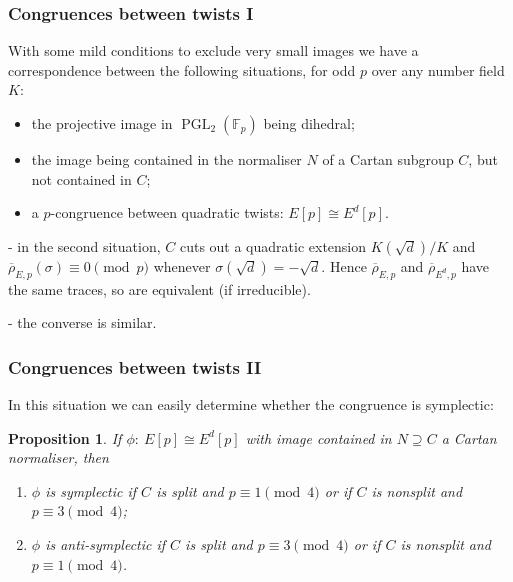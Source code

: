 \documentclass[handout]{beamer}
\newtheorem{prop}{Proposition}
\newcommand{\rhobar}{\overline{\rho}}
\newcommand{\F}{\mathbb F}
\newcommand{\PGL}{\operatorname{PGL}}
\begin{document}
\begin{frame}\frametitle{Congruences between twists I}
With some mild conditions to exclude very small images we have a
correspondence between the following situations, for odd $p$ over any
number field $K$:
\begin{itemize}
\item the projective image in $\PGL_2(\F_p)$ being dihedral;
\item the image being contained in the normaliser $N$ of a Cartan
  subgroup $C$, but not contained in $C$;
  \item a $p$-congruence between quadratic twists: $E[p]\cong E^d[p]$.
\end{itemize}
\pause\medskip

- in the second situation, $C$ cuts out a quadratic extension
$K(\sqrt{d})/K$ and $\rhobar_{E,p}(\sigma)\equiv0\pmod{p}$ whenever
$\sigma(\sqrt{d})=-\sqrt{d}$.  Hence $\rhobar_{E,p}$ and
$\rhobar_{E^d,p}$ have the same traces, so are equivalent (if
irreducible).
\pause\medskip

- the converse is similar.
\end{frame}

\begin{frame}\frametitle{Congruences between twists II}
  In this situation we can easily determine whether the congruence is
  symplectic:
  \pause  \medskip

  \begin{prop}
  If $\phi:\ E[p]\cong E^d[p]$ with image contained in $N\supseteq C$ a
  Cartan normaliser, then%
  \begin{enumerate}
    \item $\phi$ is symplectic if $C$ is split and $p\equiv1\pmod4$ or
      if $C$ is nonsplit and $p\equiv3\pmod4$;
      \item $\phi$ is anti-symplectic if $C$ is split and $p\equiv3\pmod4$ or
      if $C$ is nonsplit and $p\equiv1\pmod4$.
  \end{enumerate}

  \end{prop}

\end{frame}
\end{document}
